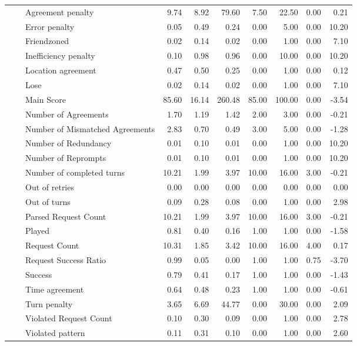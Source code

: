 \begin{tabular}{lllrrrrrrr}
 &  & Agreement penalty & 9.74 & 8.92 & 79.60 & 7.50 & 22.50 & 0.00 & 0.21 \\
 &  & Error penalty & 0.05 & 0.49 & 0.24 & 0.00 & 5.00 & 0.00 & 10.20 \\
 &  & Friendzoned & 0.02 & 0.14 & 0.02 & 0.00 & 1.00 & 0.00 & 7.10 \\
 &  & Inefficiency penalty & 0.10 & 0.98 & 0.96 & 0.00 & 10.00 & 0.00 & 10.20 \\
 &  & Location agreement & 0.47 & 0.50 & 0.25 & 0.00 & 1.00 & 0.00 & 0.12 \\
 &  & Lose & 0.02 & 0.14 & 0.02 & 0.00 & 1.00 & 0.00 & 7.10 \\
 &  & Main Score & 85.60 & 16.14 & 260.48 & 85.00 & 100.00 & 0.00 & -3.54 \\
 &  & Number of Agreements & 1.70 & 1.19 & 1.42 & 2.00 & 3.00 & 0.00 & -0.21 \\
 &  & Number of Mismatched Agreements & 2.83 & 0.70 & 0.49 & 3.00 & 5.00 & 0.00 & -1.28 \\
 &  & Number of Redundancy & 0.01 & 0.10 & 0.01 & 0.00 & 1.00 & 0.00 & 10.20 \\
 &  & Number of Reprompts & 0.01 & 0.10 & 0.01 & 0.00 & 1.00 & 0.00 & 10.20 \\
 &  & Number of completed turns & 10.21 & 1.99 & 3.97 & 10.00 & 16.00 & 3.00 & -0.21 \\
 &  & Out of retries & 0.00 & 0.00 & 0.00 & 0.00 & 0.00 & 0.00 & 0.00 \\
 &  & Out of turns & 0.09 & 0.28 & 0.08 & 0.00 & 1.00 & 0.00 & 2.98 \\
 &  & Parsed Request Count & 10.21 & 1.99 & 3.97 & 10.00 & 16.00 & 3.00 & -0.21 \\
 &  & Played & 0.81 & 0.40 & 0.16 & 1.00 & 1.00 & 0.00 & -1.58 \\
 &  & Request Count & 10.31 & 1.85 & 3.42 & 10.00 & 16.00 & 4.00 & 0.17 \\
 &  & Request Success Ratio & 0.99 & 0.05 & 0.00 & 1.00 & 1.00 & 0.75 & -3.70 \\
 &  & Success & 0.79 & 0.41 & 0.17 & 1.00 & 1.00 & 0.00 & -1.43 \\
 &  & Time agreement & 0.64 & 0.48 & 0.23 & 1.00 & 1.00 & 0.00 & -0.61 \\
 &  & Turn penalty & 3.65 & 6.69 & 44.77 & 0.00 & 30.00 & 0.00 & 2.09 \\
 &  & Violated Request Count & 0.10 & 0.30 & 0.09 & 0.00 & 1.00 & 0.00 & 2.78 \\
 &  & Violated pattern & 0.11 & 0.31 & 0.10 & 0.00 & 1.00 & 0.00 & 2.60 \\

\end{tabular}
